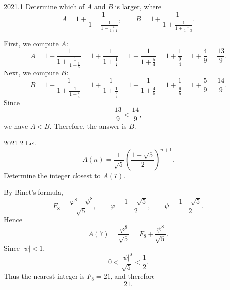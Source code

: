     \begin{pastproblem}{2021.1}
        Determine which of $A$ and $B$ is larger, where
        \[
            A
            =
            1+\frac{1}{1+\frac{1}{1-\frac{1}{1+4}}},
            \qquad
            B
            =
            1+\frac{1}{1+\frac{1}{1+\frac{1}{1+3}}}.
        \]
    \end{pastproblem}

    \begin{solution}
        First, we compute $A$:
        \[
            A
            =
            1+\frac{1}{1+\frac{1}{1-\frac{1}{5}}}
            =
            1+\frac{1}{1+\frac{1}{\frac{4}{5}}}
            =
            1+\frac{1}{1+\frac{5}{4}}
            =
            1+\frac{1}{\frac{9}{4}}
            =
            1+\frac{4}{9}
            =
            \frac{13}{9}.
        \]
        Next, we compute $B$:
        \[
            B
            =
            1+\frac{1}{1+\frac{1}{1+\frac{1}{4}}}
            =
            1+\frac{1}{1+\frac{1}{\frac{5}{4}}}
            =
            1+\frac{1}{1+\frac{4}{5}}
            =
            1+\frac{1}{\frac{9}{5}}
            =
            1+\frac{5}{9}
            =
            \frac{14}{9}.
        \]
        Since
        \[
            \frac{13}{9}<\frac{14}{9},
        \]
        we have $A<B$. Therefore, the answer is $\boxed{B}$.
    \end{solution}

    \begin{pastproblem}{2021.2}
        Let
        \[
            A(n)
            =
            \frac{1}{\sqrt5}
            \left(\frac{1+\sqrt5}{2}\right)^{n+1}.
        \]
        Determine the integer closest to $A(7)$.
    \end{pastproblem}

    \begin{solution}
        By Binet's formula,
        \[
            F_8
            =
            \frac{\varphi^8-\psi^8}{\sqrt5},
            \qquad
            \varphi=\frac{1+\sqrt5}{2},
            \qquad
            \psi=\frac{1-\sqrt5}{2}.
        \]
        Hence
        \[
            A(7)=\frac{\varphi^8}{\sqrt5}
            =F_8+\frac{\psi^8}{\sqrt5}.
        \]
        Since $|\psi|<1$,
        \[
            0<\frac{|\psi|^8}{\sqrt5}<\frac12.
        \]
        Thus the nearest integer is $F_8=21$, and therefore
        \[
            \boxed{21}.
        \]
    \end{solution}

